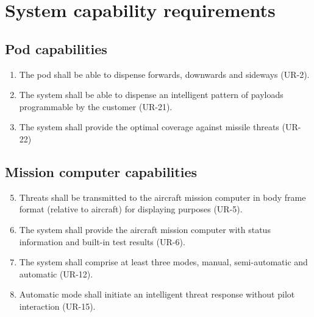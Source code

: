 \documentclass[Main]{subfiles}
\begin{document}
\section{System capability requirements}

\subsection{Pod capabilities}\label{pod}

\begin{enumerate}[{SR}-1]
\item The pod shall be able to dispense forwards, downwards and sideways (UR-2).

\item The system shall be able to dispense an intelligent pattern of payloads programmable by the customer (UR-21).

\item The system shall provide the optimal coverage against missile threats (UR-22)

\end{enumerate}

\subsection{Mission computer capabilities}

\begin{enumerate}[{SR}-1]
\setcounter{enumi}{4}
\item Threats shall be transmitted to the aircraft mission computer in body frame format (relative to aircraft) for displaying purposes (UR-5).\label{asd}

\item The system shall provide the aircraft mission computer with status information and built-in test results (UR-6).

\item The system shall comprise at least three modes, manual, semi-automatic and automatic (UR-12).

\item Automatic mode shall initiate an intelligent threat response without pilot interaction (UR-15).

\end{enumerate}
\end{document}
